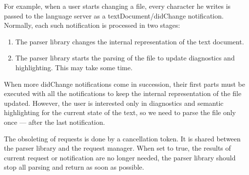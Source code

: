 For example, when a user starts changing a file, every character he writes is passed to the language server as a textDocument/didChange notification. Normally, each such notification is processed in two stages:
\begin{enumerate}
	\item The parser library changes the internal representation of the text document.
	\item The parser library starts the parsing of the file to update diagnostics and highlighting. This may take some time.
\end{enumerate}
When more didChange notifications come in succession, their first parts must be executed with all the notifications to keep the internal representation of the file updated. However, the user is interested only in diagnostics and semantic highlighting for the current state of the text, so we need to parse the file only once --- after the last notification.

The obsoleting of requests is done by a cancellation token. It is shared between the parser library and the request manager. When set to true, the results of current request or notification are no longer needed, the parser library should stop all parsing and return as soon as possible.


